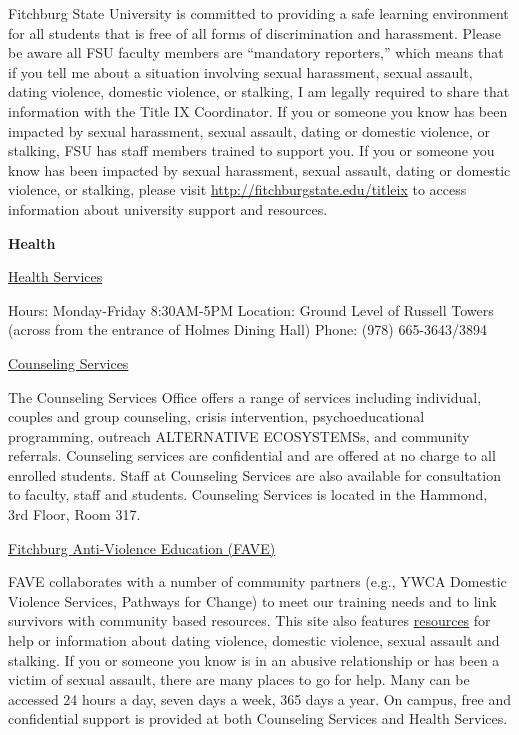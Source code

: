 \documentclass[
  letterpaper,
  DIV=11,
  numbers=noendperiod,
  oneside]{scrartcl}
\begin{document}
Fitchburg State University is committed to providing a safe learning
environment for all students that is free of all forms of discrimination
and harassment. Please be aware all FSU faculty members are ``mandatory
reporters,'' which means that if you tell me about a situation involving
sexual harassment, sexual assault, dating violence, domestic violence,
or stalking, I am legally required to share that information with the
Title IX Coordinator. If you or someone you know has been impacted by
sexual harassment, sexual assault, dating or domestic violence, or
stalking, FSU has staff members trained to support you. If you or
someone you know has been impacted by sexual harassment, sexual assault,
dating or domestic violence, or stalking, please visit
\url{http://fitchburgstate.edu/titleix} to access information about
university support and resources.

\textbf{Health}

\href{http://www.google.com/url?q=http\%3A\%2F\%2Fwww.fitchburgstate.edu\%2Foffices-services-directory\%2Fhealth-services\%2F&sa=D&sntz=1&usg=AFQjCNEw5V0i0hL5DVO5b43gejNNaAt4ig}{Health
Services}

Hours: Monday-Friday 8:30AM-5PM Location: Ground Level of Russell Towers
(across from the entrance of Holmes Dining Hall) Phone: (978)
665-3643/3894

\href{http://www.google.com/url?q=http\%3A\%2F\%2Fwww.fitchburgstate.edu\%2Foffices-services-directory\%2Fcounseling-services\%2F&sa=D&sntz=1&usg=AFQjCNEYiS4EmSvWerpp2bKr5lTpouPuqQ}{Counseling
Services}

The Counseling Services Office offers a range of services including
individual, couples and group counseling, crisis intervention,
psychoeducational programming, outreach ALTERNATIVE ECOSYSTEMSs, and
community referrals. Counseling services are confidential and are
offered at no charge to all enrolled students. Staff at Counseling
Services are also available for consultation to faculty, staff and
students. Counseling Services is located in the Hammond, 3rd Floor, Room
317.

\href{http://www.google.com/url?q=http\%3A\%2F\%2Fwww.fitchburgstate.edu\%2Foffices-services-directory\%2Ffitchburg-anti-violence-education\%2F&sa=D&sntz=1&usg=AFQjCNFi5qy-wunMxX-hoWbA9YwT8aa4Ig}{Fitchburg
Anti-Violence Education (FAVE)}

FAVE collaborates with a number of community partners (e.g., YWCA
Domestic Violence Services, Pathways for Change) to meet our training
needs and to link survivors with community based resources. This site
also features
\href{http://www.google.com/url?q=http\%3A\%2F\%2Fwww.fitchburgstate.edu\%2Foffices-services-directory\%2Ffitchburg-anti-violence-education\%2Ffitchburg-anti-violence-education-resources\%2F&sa=D&sntz=1&usg=AFQjCNF9KZ2O1AvPMLJTHdNg1DfmYYtgog}{resources}
for help or information about dating violence, domestic violence, sexual
assault and stalking. If you or someone you know is in an abusive
relationship or has been a victim of sexual assault, there are many
places to go for help. Many can be accessed 24 hours a day, seven days a
week, 365 days a year. On campus, free and confidential support is
provided at both Counseling Services and Health Services.
\end{document}
